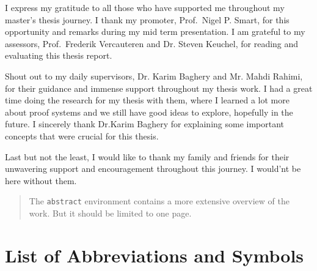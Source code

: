\documentclass[master=mcs]{kulemt}
\begin{document}
\begin{preface}
  I express my gratitude to all those who have supported me throughout my master's thesis 
  journey. I thank my promoter, Prof.\ Nigel P. Smart, for this opportunity and remarks 
  during my mid term presentation. I am grateful to my assessors, Prof.\ Frederik Vercauteren and 
  Dr. Steven Keuchel, for reading and evaluating this thesis report.\par

  Shout out to my daily supervisors, Dr. Karim Baghery and Mr. Mahdi Rahimi, for their 
  guidance and immense support throughout my thesis work. I had a great time doing the research 
  for my thesis with them, where I learned a lot more about proof systems and we still have 
  good ideas to explore, hopefully in the future. I sincerely thank Dr.Karim Baghery for explaining 
  some important concepts that were crucial for this thesis.\par

  Last but not the least, I would like to thank my family and friends for their
  unwavering support and encouragement throughout this journey. I would'nt be here without them.
\end{preface}

\tableofcontents*

\begin{abstract}
  The \texttt{abstract} environment contains a more extensive overview of
  the work. But it should be limited to one page.

  \lipsum[1]
\end{abstract}

\listoffiguresandtables
\chapter{List of Abbreviations and Symbols}
\end{document}
